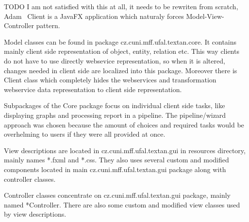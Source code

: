 TODO I am not satisfied with this at all, it needs to be rewriten from scratch, Adam
\textan\ Client is a JavaFX application which naturaly forces Model-View-Controller
pattern.

Model classes can be found in package cz.cuni.mff.ufal.textan.core. It contains
mainly client side representation of object, entity, relation etc. This way
clients do not have to use directly websevice representation, so when it is
altered, changes needed in client side are localized into this package. Moreover
there is Client class which completely hides the webservices and transformation
webservice data representation to client side representation.

Subpackages of the Core package focus on individual client side tasks, like
displaying graphs and processing report in a pipeline. The pipeline/wizard
approach was chosen because the amount of choices and required tasks would
be overhelming to users if they were all provided at once.

View descriptions are located in cz.cuni.mff.ufal.textan.gui in resources
directory, mainly names *.fxml and *.css. They also uses several custom and
modified components located in main cz.cuni.mff.ufal.textan.gui package along
with controller classes.

Controller classes concentrate on cz.cuni.mff.ufal.textan.gui package,
mainly named *Controller. There are also some custom and modified view classes
used by view descriptions.
